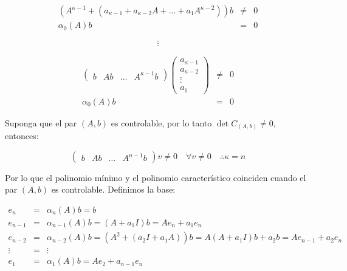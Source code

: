         \begin{eqnarray}
        (A^{\kappa - 1} + (a_{\kappa - 1} + a_{\kappa - 2} A + \dots + a_1 A^{\kappa - 2})) b & \ne & 0 \nonumber \\
        \alpha_0(A) b & = & 0 \nonumber
        \end{eqnarray}

        \begin{equation}
            \vdots \nonumber
        \end{equation}

        \begin{eqnarray}
        \begin{pmatrix}
        b & Ab & \dots & A^{\kappa - 1} b
        \end{pmatrix}
        \begin{pmatrix}
        a_{\kappa - 1} \\
        a_{\kappa - 2} \\
        \vdots \\
        a_{1}
        \end{pmatrix} & \ne & 0 \nonumber \\
        \alpha_0(A) b & = & 0 \nonumber
        \end{eqnarray}

        Suponga que el par $(A,b)$ es controlable, por lo tanto $\det{C_{(A,b)}} \ne 0$, entonces:

        \begin{equation}
            \begin{pmatrix}
            b & A b & \dots & A^{n-1} b
            \end{pmatrix} v \ne 0 \quad \forall v \ne 0 \quad \therefore \kappa = n
        \end{equation}

        Por lo que el polinomio mínimo y el polinomio característico coinciden cuando el par $(A,b)$ es controlable. Definimos la base:

        \begin{eqnarray}
        e_n & = & \alpha_n(A) b = b \nonumber \\
        e_{n-1} & = & \alpha_{n-1}(A) b = (A + a_1I) b = A e_n + a_1 e_n \nonumber \\
        e_{n-2} & = & \alpha_{n-2}(A) b = (A^2 + (a_2I + a_1A)) b = A(A+a_1I) b + a_2 b = A e_{n-1} + a_2 e_n \nonumber \\
        \vdots & = & \vdots \nonumber \\
        e_1 & = & \alpha_1(A) b = A e_2 + a_{n-1} e_n
        \end{eqnarray}

